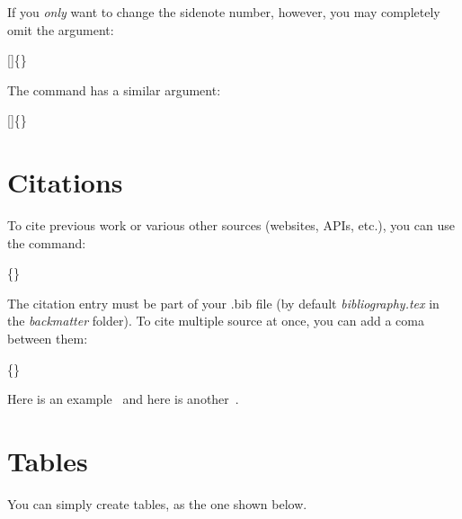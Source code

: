 If you \emph{only} want to change the sidenote number, however, you may
completely omit the  argument:
\begin{docspec}
  []\{\}
\end{docspec}

The  command has a similar  argument:
\begin{docspec}
  []\{\}
\end{docspec}


\section{Citations}

To cite previous work or various other sources (websites, APIs, etc.), you can use the command:
\begin{docspec}
  \{\}
\end{docspec}
The citation entry must be part of your .bib file (by default \textit{bibliography.tex} in the \textit{backmatter} folder). To cite multiple source at once, you can add a coma between them:
\begin{docspec}
  \{\}
\end{docspec}
Here is an example~\cite{Tufte2006} and here is another~\cite{Tufte1990, Tufte1997, Tufte2001}.




\section{Tables}

You can simply create tables, as the one shown below.

